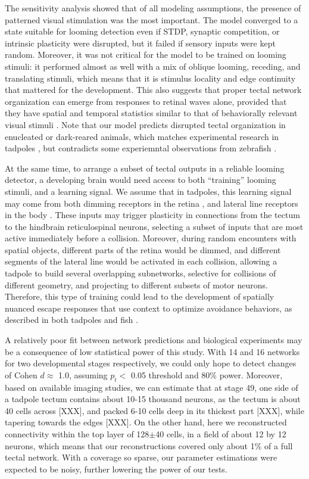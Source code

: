\documentclass{article}
\begin{document}
The sensitivity analysis showed that of all modeling assumptions, the presence of patterned visual stimulation was the most important. The model converged to a state suitable for looming detection even if STDP, synaptic competition, or intrinsic plasticity were disrupted, but it failed if sensory inputs were kept random. Moreover, it was not critical for the model to be trained on looming stimuli: it performed almost as well with a mix of oblique looming, receding, and translating stimuli, which means that it is stimulus locality and edge continuity that mattered for the development. This also suggests that proper tectal network organization can emerge from responses to retinal waves alone, provided that they have spatial and temporal statistics similar to that of behaviorally relevant visual stimuli \citep{huberman2008waves}. Note that our model predicts disrupted tectal organization in enucleated or dark-reared animals, which matches experimental research in tadpoles \citep{xu2011}, but contradicts some experiemntal observations from zebrafish \citep{pietri2017emergence}.

At the same time, to arrange a subset of tectal outputs in a reliable looming detector, a developing brain would need access to both “training” looming stimuli, and a learning signal. We assume that in tadpoles, this learning signal may come from both dimming receptors in the retina \citep{baranauskas2012}, and lateral line receptors in the body \citep{truszkowski2017}. These inputs may trigger plasticity in connections from the tectum to the hindbrain reticulospinal neurons, selecting a subset of inputs that are most active immediately before a collision. Moreover, during random encounters with spatial objects, different parts of the retina would be dimmed, and different segments of the lateral line would be activated in each collision, allowing a tadpole to build several overlapping subnetworks, selective for collisions of different geometry, and projecting to different subsets of motor neurons. Therefore, this type of training could lead to the development of spatially nuanced escape responses that use context to optimize avoidance behaviors, as described in both tadpoles \citep{khakhalin2014} and fish \citep{bhattacharyya2017assessment}.

A relatively poor fit between network predictions and biological experiments may be a consequence of low statistical power of this study. With 14 and 16 networks for two developmental stages respectively, we could only hope to detect changes of Cohen $d \approx$ 1.0, assuming $p_t<$ 0.05 threshold and 80\% power. Moreover, based on available imaging studies, we can estimate that at stage 49, one side of a tadpole tectum contains about 10-15 thousand neurons, as the tectum is about 40 cells across [XXX], and packed 6-10 cells deep in its thickest part [XXX], while tapering towards the edges [XXX]. On the other hand, here we reconstructed connectivity within the top layer of 128$\pm$40 cells, in a field of about 12 by 12 neurons, which means that our reconstructions covered only about 1\% of a full tectal network. With a coverage so sparse, our parameter estimations were expected to be noisy, further lowering the power of our tests.
\end{document}

